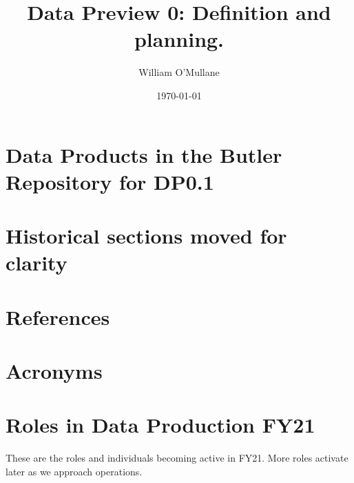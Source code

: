 \documentclass[OPS,authoryear]{lsstdoc}
\title{Data Preview 0: Definition and planning.}
\author{%
William O'Mullane
}
\date{\today}
\begin{document}

\mkshorttitle





\appendix

\section{Data Products in the Butler Repository for DP0.1} \label{sec:dp01butler}

\section{Historical sections moved for clarity}



\section{References} \label{sec:bib}
\renewcommand{\refname}{}


\section{Acronyms} \label{sec:acronyms}


\section {Roles in Data Production FY21}
These are the roles and individuals becoming active in FY21.
More roles activate later as we approach operations.

\end{document}
